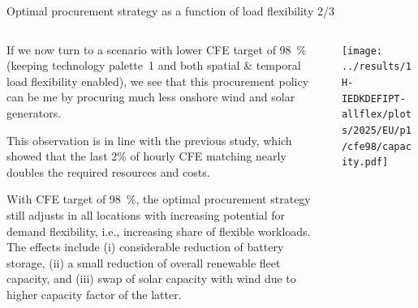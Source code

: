 \begin{frame}{Optimal procurement strategy as a function of load flexibility 2/3}

  {\footnotesize
  \vspace{0.2cm}
  
  \begin{columns}[T]

  \begin{column}{6cm}
  If we now turn to a scenario with \alert{lower CFE target of 98~\%} (keeping technology palette~1 and both spatial \& temporal load flexibility enabled), we see that this procurement policy can be me by procuring much less onshore wind and solar generators.
  
  \vspace{0.1cm}
  This observation is in line with the previous study, which showed that the last 2\% of hourly CFE matching nearly doubles the required resources and costs.  

  \vspace{0.1cm}
  With CFE target of 98~\%, the optimal procurement strategy still adjusts in all locations  with increasing potential for demand flexibility, i.e., increasing share of flexible workloads. The effects include (i) considerable reduction of battery storage, (ii) a small reduction of overall renewable fleet capacity, and (iii) swap of solar capacity with wind due to higher capacity factor of the latter. 
  
  \end{column}

  \begin{column}{9cm}
    \centering
    \texttt{[image: ../results/1H-IEDKDEFIPT-allflex/plots/2025/EU/p1/cfe98/capacity.pdf]}
  \end{column}
  \end{columns}
  }
  \end{frame}


